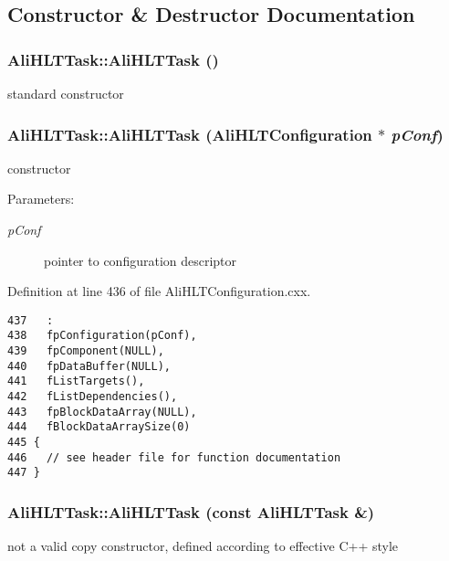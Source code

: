 \subsection{Constructor \& Destructor Documentation}
\subsubsection{\setlength{\rightskip}{0pt plus 5cm}Ali\-HLTTask::Ali\-HLTTask ()}\label{classAliHLTTask_a0}


standard constructor 
\subsubsection{\setlength{\rightskip}{0pt plus 5cm}Ali\-HLTTask::Ali\-HLTTask ({\bf Ali\-HLTConfiguration} $\ast$ {\em p\-Conf})}\label{classAliHLTTask_a1}


constructor \begin{Desc}
\item[Parameters:]
\begin{description}
\item[{\em p\-Conf}]pointer to configuration descriptor \end{description}
\end{Desc}


Definition at line 436 of file Ali\-HLTConfiguration.cxx.

\footnotesize\begin{verbatim}437   :
438   fpConfiguration(pConf),
439   fpComponent(NULL),
440   fpDataBuffer(NULL),
441   fListTargets(),
442   fListDependencies(),
443   fpBlockDataArray(NULL),
444   fBlockDataArraySize(0)
445 {
446   // see header file for function documentation
447 }

\end{verbatim}\normalsize 


\subsubsection{\setlength{\rightskip}{0pt plus 5cm}Ali\-HLTTask::Ali\-HLTTask (const {\bf Ali\-HLTTask} \&)}\label{classAliHLTTask_a2}


not a valid copy constructor, defined according to effective C++ style 


